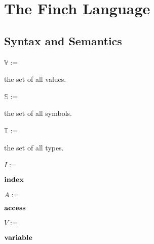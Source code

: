 
\section{The Finch Language}

\subsection{Syntax and Semantics}

\newlength{\leftwidth}
\setlength{\leftwidth}{.4\linewidth}
\newlength{\rightwidth}
\setlength{\rightwidth}{.6\linewidth}

\noindent\begin{minipage}{\leftwidth}
\raggedleft $\mathbb{V} :=$~
\end{minipage}%
\begin{minipage}{\rightwidth}
the set of all values.~
\end{minipage}

\noindent\begin{minipage}{\leftwidth}
\raggedleft $\mathbb{S} :=$~
\end{minipage}%
\begin{minipage}{\rightwidth}
the set of all symbols.
\end{minipage}

\noindent\begin{minipage}{\leftwidth}
\raggedleft $\mathbb{T} :=$~
\end{minipage}%
\begin{minipage}{\rightwidth}
the set of all types.
\end{minipage}

\noindent\begin{minipage}{\leftwidth}
\raggedleft $I :=$~
\end{minipage}%
\begin{minipage}{\rightwidth}
$\text{\textbf{index}}$
\end{minipage}

\noindent\begin{minipage}{\leftwidth}
\raggedleft $A :=$~
\end{minipage}%
\begin{minipage}{\rightwidth}
$\text{\textbf{access}}$
\end{minipage}

\noindent\begin{minipage}{\leftwidth}
\raggedleft $V :=$~
\end{minipage}%
\begin{minipage}{\rightwidth}
$\text{\textbf{variable}}$
\end{minipage}

